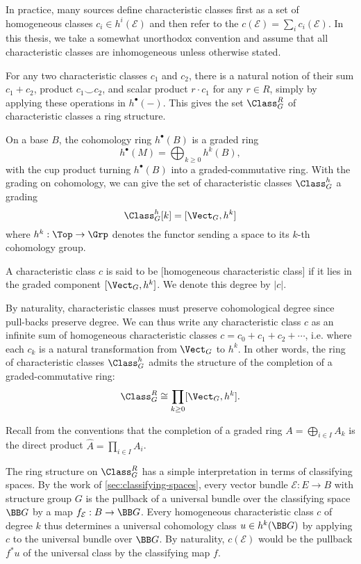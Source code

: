 \begin{remark}
	In practice, many sources define characteristic classes first as a set of homogeneous classes $c_i\in h^i(\mathcal{E})$ and then refer to the  $c(\mathcal{E})=\sum_i c_i(\mathcal{E})$. In this thesis, we take a somewhat unorthodox convention and assume that all characteristic classes are inhomogeneous unless otherwise stated.
\end{remark}

For any two characteristic classes $c_1$ and $c_2$, there is a natural notion of their sum $c_1+c_2$, product $c_1\smile c_2$, and scalar product $r\cdot c_1$ for any $r\in R$, simply by applying these operations in $h^\bullet(-)$. This gives the set $\Class_G^R$ of characteristic classes a ring structure.

On a base $B$, the cohomology ring $h^\bullet(B)$ is a graded ring
\[
	h^\bullet(M) = \bigoplus_{k\geq 0} h^k(B),
\]
with the cup product turning $h^\bullet(B)$ into a graded-commutative ring.
With the grading on cohomology, we can give the set of characteristic classes $\Class_G^h$ a grading
\[
	\Class_G^h[k] = [\Vect_G, h^k]
\]
where $h^k: \Top \to \Grp$ denotes the functor sending a space to its $k$-th cohomology group.

\begin{definition}
	A characteristic class $c$ is said to be [homogeneous characteristic class] if it lies in the graded component $[\Vect_G, h^k]$. We denote this degree by $|c|$.
\end{definition}

By naturality, characteristic classes must preserve cohomological degree since pull-backs preserve degree. We can thus write any characteristic class $c$ as an infinite sum of homogeneous characteristic classes $c=c_0+c_1+c_2+\cdots$, i.e. where each $c_k$ is a natural transformation from $\Vect_G$ to $h^k$.
In other words, the ring of characteristic classes $\Class_G^h$ admits the structure of the completion of a graded-commutative ring:
\[
	\Class_G^R \cong \prod_{k \geq 0} [\Vect_G, h^k].
\]
\begin{remark}
	Recall from the conventions that the completion of a graded ring $A=\bigoplus_{i\in I} A_k$ is the direct product $\widehat{A}=\prod_{i\in I} A_i$.
\end{remark}

The ring structure on $\Class_G^R$ has a simple interpretation in terms of classifying spaces. By the work of \cref{sec:classifying-spaces}, every vector bundle $\mathcal{E} : E \to B$ with structure group $G$ is the pullback of a universal bundle over the classifying space $\BB G$ by a map $f_{\mathcal{E}} : B \to \BB G$.
Every homogeneous characteristic class $c$ of degree $k$ thus determines a universal cohomology class $u\in h^k(\BB G)$ by applying $c$ to the universal bundle over $\BB G$. By naturality, $c(\mathcal{E})$ would be the pullback $f^*u$ of the universal class by the classifying map $f$.

